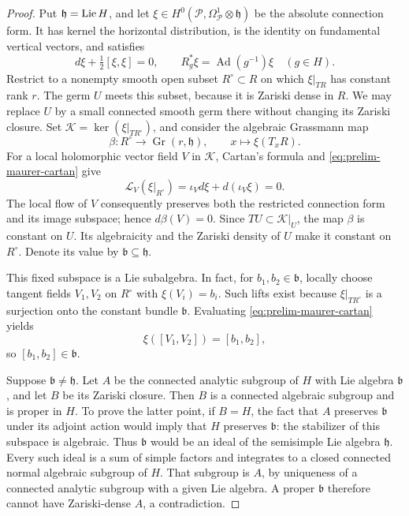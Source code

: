 \begin{proof}
Put $\mathfrak h=\operatorname{Lie} H$, and let
$\xi\in H^0(\mathcal P,\Omega^1_{\mathcal P}\otimes\mathfrak h)$
be the absolute connection form.  It has kernel the horizontal
distribution, is the identity on fundamental vertical vectors, and
satisfies
\begin{equation}\label{eq:prelim-maurer-cartan}
 d\xi+\tfrac12[\xi,\xi]=0,\qquad
 R_g^*\xi=\operatorname{Ad}(g^{-1})\xi\quad(g\in H).
\end{equation}
Restrict to a nonempty smooth open subset $R^\circ\subset R$ on which
$\xi|_{TR}$ has constant rank $r$.  The germ $U$ meets this subset, because
it is Zariski dense in $R$.  We may replace $U$ by a small connected
smooth germ there without changing its Zariski closure.  Set
$\mathcal K=\ker(\xi|_{TR^\circ})$, and consider the algebraic
Grassmann map
\[
 \beta:R^\circ\longrightarrow\operatorname{Gr}(r,\mathfrak h),
 \qquad x\longmapsto\xi(T_xR).
\]
For a local holomorphic vector field $V$ in $\mathcal K$, Cartan's
formula and \eqref{eq:prelim-maurer-cartan} give
\[
 \mathcal L_V(\xi|_{R^\circ})
 =\iota_Vd\xi+d(\iota_V\xi)=0.
\]
The local flow of $V$ consequently preserves both the restricted
connection form and its image subspace; hence $d\beta(V)=0$.
Since $TU\subset\mathcal K|_U$, the map $\beta$ is constant on $U$.
Its algebraicity and the Zariski density of $U$ make it constant on
$R^\circ$.  Denote its value by $\mathfrak b\subseteq\mathfrak h$.

This fixed subspace is a Lie subalgebra.  In fact, for $b_1,b_2\in
\mathfrak b$, locally choose tangent fields $V_1,V_2$ on $R^\circ$ with
$\xi(V_i)=b_i$.  Such lifts exist because $\xi|_{TR^\circ}$ is a
surjection onto the constant bundle $\mathfrak b$.  Evaluating
\eqref{eq:prelim-maurer-cartan} yields
\[
 \xi([V_1,V_2])=[b_1,b_2],
\]
so $[b_1,b_2]\in\mathfrak b$.

Suppose $\mathfrak b\ne\mathfrak h$.  Let $A$ be the connected analytic
subgroup of $H$ with Lie algebra $\mathfrak b$, and let $B$ be its
Zariski closure.  Then $B$ is a connected algebraic subgroup and is
proper in $H$.  To prove the latter point, if $B=H$, the fact that $A$
preserves $\mathfrak b$ under its adjoint action would imply that $H$
preserves $\mathfrak b$: the stabilizer of this subspace is algebraic.
Thus $\mathfrak b$ would be an ideal of the semisimple Lie algebra
$\mathfrak h$.  Every such ideal is a sum of simple factors and
integrates to a closed connected normal algebraic subgroup of $H$.
That subgroup is $A$, by uniqueness of a connected analytic subgroup
with a given Lie algebra.  A proper $\mathfrak b$ therefore cannot have
Zariski-dense $A$, a contradiction.


\end{proof}
